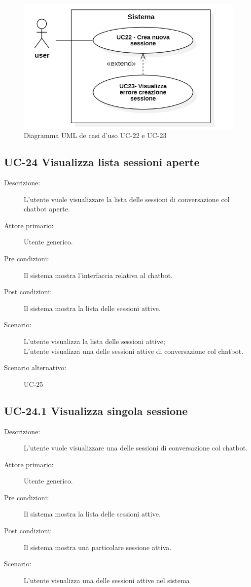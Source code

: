 \begin{figure}[H]
    \centering
    \includegraphics[width=0.8\linewidth]{UC22-23.PNG}
    \caption{Diagramma UML de casi d'uso UC-22 e UC-23}
    \label{fig:UC22-23}
\end{figure}

\subsection{UC-24 Visualizza lista sessioni aperte}
\begin{description}
    \item[Descrizione:] L'utente vuole visualizzare la lista delle sessioni di conversazione col chatbot aperte.
    \item[Attore primario:] Utente generico.
    \item[Pre condizioni:] Il sistema mostra l'interfaccia relativa al chatbot.
    \item[Post condizioni:] Il sistema mostra la lista delle sessioni attive.
    \item[Scenario:] L'utente visualizza la lista delle sessioni attive;\\L'utente visualizza una delle sessioni attive di conversazione col chatbot.
    \item[Scenario alternativo:] UC-25
\end{description}

\subsection{UC-24.1 Visualizza singola sessione}
\begin{description}
    \item[Descrizione:] L'utente vuole visualizzare una delle sessioni di conversazione col chatbot.
    \item[Attore primario:] Utente generico.
    \item[Pre condizioni:] Il sistema mostra la lista delle sessioni attive.
        \item[Post condizioni:] Il sistema mostra una particolare sessione attiva.
    \item[Scenario:] L'utente visualizza una delle sessioni attive nel sistema
\end{description}

